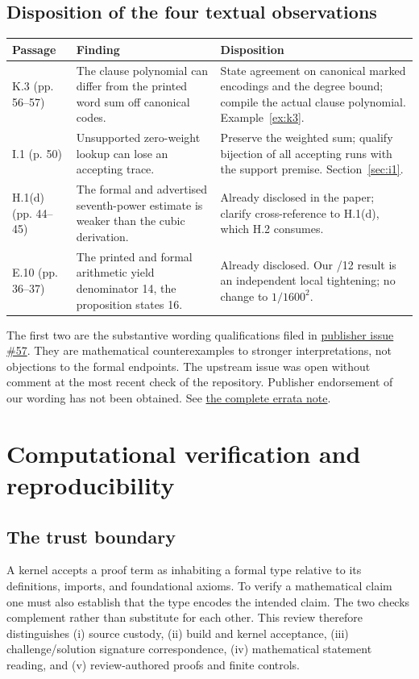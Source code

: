 \documentclass[11pt,letterpaper]{article}
\theoremstyle{definition}\newtheorem{definition}[theorem]{Definition}\newtheorem{example}[theorem]{Example}
\theoremstyle{remark}\newtheorem{remark}[theorem]{Remark}
\newcommand{\aud}[2]{\href{https://github.com/nousentllc/VP-VNP-Review/blob/567303d0bcf4f9d54390437b137752446e58ccd6/#1}{#2}}
\begin{document}
\subsection{Disposition of the four textual observations}
\begin{longtable}{@{}p{.13\linewidth}p{.40\linewidth}p{.39\linewidth}@{}}
\toprule
Passage & Finding & Disposition \\\midrule\endhead
K.3 (pp. 56--57) & The clause polynomial can differ from the printed word sum off canonical codes. & State agreement on canonical marked encodings and the degree bound; compile the actual clause polynomial. Example~\ref{ex:k3}.\\[3pt]
I.1 (p. 50) & Unsupported zero-weight lookup can lose an accepting trace. & Preserve the weighted sum; qualify bijection of all accepting runs with the support premise. Section~\ref{sec:i1}.\\[3pt]
H.1(d) (pp. 44--45) & The formal and advertised seventh-power estimate is weaker than the cubic derivation. & Already disclosed in the paper; clarify cross-reference to H.1(d), which H.2 consumes.\\[3pt]
E.10 (pp. 36--37) & The printed and formal arithmetic yield denominator 14, the proposition states 16. & Already disclosed. Our /12 result is an independent local tightening; no change to $1/1600^2$.\\
\bottomrule
\end{longtable}
The first two are the substantive wording qualifications filed in \href{https://github.com/anthropics/formal-math/issues/57}{publisher issue \#57}. They are mathematical counterexamples to stronger interpretations, not objections to the formal endpoints. The upstream issue was open without comment at the most recent check of the repository. Publisher endorsement of our wording has not been obtained. See \aud{passes/publisher-errata.md}{the complete errata note}.

\section{Computational verification and reproducibility}\label{sec:formal}
\subsection{The trust boundary}
A kernel accepts a proof term as inhabiting a formal type relative to its definitions, imports, and foundational axioms. To verify a mathematical claim one must also establish that the type encodes the intended claim. The two checks complement rather than substitute for each other. This review therefore distinguishes (i) source custody, (ii) build and kernel acceptance, (iii) challenge/solution signature correspondence, (iv) mathematical statement reading, and (v) review-authored proofs and finite controls.
\end{document}
